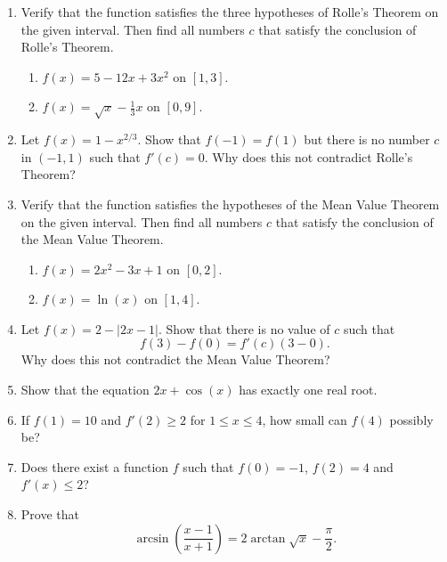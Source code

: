 

\begin{enumerate}


	\item 	Verify that the function satisfies the three hypotheses of Rolle's Theorem on the given interval.
		Then find all numbers $c$ that satisfy the conclusion of Rolle's Theorem.
		\begin{enumerate}
			\item	$f(x) = 5 - 12x + 3x^2$ on $[1,3]$.
			\item	$f(x) = \sqrt{x} - \frac{1}{3}x$ on $[0,9]$.
		\end{enumerate}

	\item	Let $f(x) = 1 - x^{2/3}$. Show that $f(-1)=f(1)$ but there is no number $c$ in $(-1,1)$ such that $f'(c)=0$.
		Why does this not contradict Rolle's Theorem?

	\item 	Verify that the function satisfies the hypotheses of the Mean Value Theorem on the given interval.
		Then find all numbers $c$ that satisfy the conclusion of the Mean Value Theorem.
		\begin{enumerate}
			\item	$f(x) = 2x^2 - 3x +1$ on $[0,2]$.
			\item	$f(x) = \ln(x)$ on $[1,4]$.
		\end{enumerate}

	\item	Let $f(x) = 2 - |2x-1|$. Show that there is no value of $c$ such that
		\[
			f(3)-f(0) = f'(c)(3-0).
		\]
		Why does this not contradict the Mean Value Theorem?

	\item	Show that the equation $2x + \cos(x)$ has exactly one real root.

	\item	If $f(1)=10$ and $f'(2) \geq 2$ for $1 \leq x \leq 4$, how small can $f(4)$ possibly be?

	\item	Does there exist a function $f$ such that $f(0) = -1$, $f(2) = 4$ and $f'(x) \leq 2$?


	\item	Prove that
		\[
			\arcsin \left( \frac{x-1}{x+1} \right) = 2 \arctan \sqrt{x} - \frac{\pi}{2}.
		\]



\end{enumerate} 




